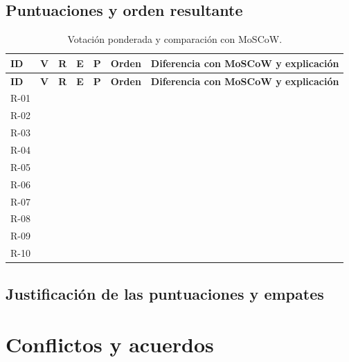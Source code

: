 \documentclass[11pt,a4paper]{article}
\begin{document}
\subsection{Puntuaciones y orden resultante}

\begingroup
\small

\begin{longtable}{
    |L{1cm}
    |L{0.8cm}
    |L{0.8cm}
    |L{0.8cm}
    |L{1.1cm}
    |L{1cm}
    |L{6.7cm}|
}
\caption{Votación ponderada y comparación con MoSCoW.}
\label{tab:votacion}\\
\hline
{}
\textbf{ID} &
\textbf{V} &
\textbf{R} &
\textbf{E} &
\textbf{P} &
\textbf{Orden} &
\textbf{Diferencia con MoSCoW y explicación} \\
\hline
\endfirsthead

\hline
{}
\textbf{ID} &
\textbf{V} &
\textbf{R} &
\textbf{E} &
\textbf{P} &
\textbf{Orden} &
\textbf{Diferencia con MoSCoW y explicación} \\
\hline
\endhead

R-01 & & & & & & \\ \hline
R-02 & & & & & & \\ \hline
R-03 & & & & & & \\ \hline
R-04 & & & & & & \\ \hline
R-05 & & & & & & \\ \hline
R-06 & & & & & & \\ \hline
R-07 & & & & & & \\ \hline
R-08 & & & & & & \\ \hline
R-09 & & & & & & \\ \hline
R-10 & & & & & & \\ \hline

\end{longtable}

\endgroup

\subsection{Justificación de las puntuaciones y empates}

\section{Conflictos y acuerdos}
\end{document}
